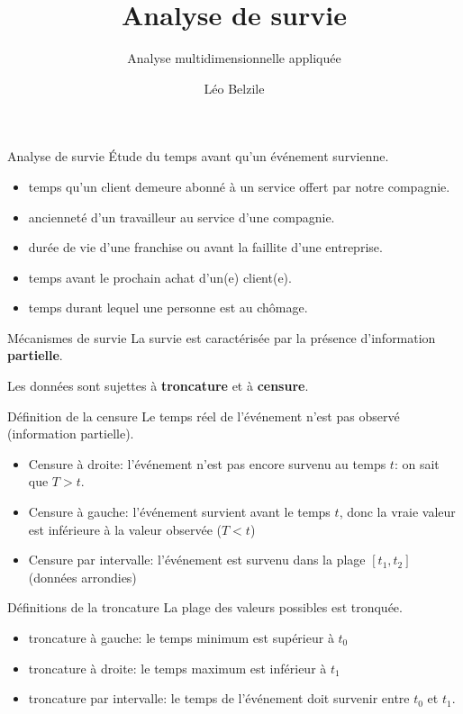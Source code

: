 \documentclass[
  ignorenonframetext,
]{beamer}
\title{\texorpdfstring{Analyse de survie}{Analyse de survie}}
\subtitle{\texorpdfstring{Analyse multidimensionnelle
appliquée}{Analyse multidimensionnelle appliquée}}
\author{Léo Belzile}
\date{}
\institute{HEC Montréal}
\providecommand{\tightlist}{%
  \setlength{\itemsep}{0pt}\setlength{\parskip}{0pt}}
\begin{document}
\frame{\titlepage}


\begin{frame}{Analyse de survie}
\protect{}\label{analyse-de-survie}
Étude du temps avant qu'un événement survienne.

\begin{itemize}
\tightlist
\item
  temps qu'un client demeure abonné à un service offert par notre
  compagnie.
\item
  ancienneté d'un travailleur au service d'une compagnie.
\item
  durée de vie d'une franchise ou avant la faillite d'une entreprise.
\item
  temps avant le prochain achat d'un(e) client(e).
\item
  temps durant lequel une personne est au chômage.
\end{itemize}
\end{frame}

\begin{frame}{Mécanismes de survie}
\protect{}\label{muxe9canismes-de-survie}
La survie est caractérisée par la présence d'information
\textbf{partielle}.

Les données sont sujettes à \textbf{troncature} et à \textbf{censure}.
\end{frame}

\begin{frame}{Définition de la censure}
\protect{}\label{duxe9finition-de-la-censure}
Le temps réel de l'événement n'est pas observé (information partielle).

\begin{itemize}
\tightlist
\item
  Censure à droite: l'événement n'est pas encore survenu au temps \(t\):
  on sait que \(T > t\).
\item
  Censure à gauche: l'événement survient avant le temps \(t\), donc la
  vraie valeur est inférieure à la valeur observée (\(T < t\))
\item
  Censure par intervalle: l'événement est survenu dans la plage
  \([t_1, t_2]\) (données arrondies)
\end{itemize}
\end{frame}

\begin{frame}{Définitions de la troncature}
\protect{}\label{duxe9finitions-de-la-troncature}
La plage des valeurs possibles est tronquée.

\begin{itemize}
\tightlist
\item
  troncature à gauche: le temps minimum est supérieur à \(t_0\)
\item
  troncature à droite: le temps maximum est inférieur à \(t_1\)
\item
  troncature par intervalle: le temps de l'événement doit survenir entre
  \(t_0\) et \(t_1\).
\end{itemize}
\end{frame}
\end{document}
